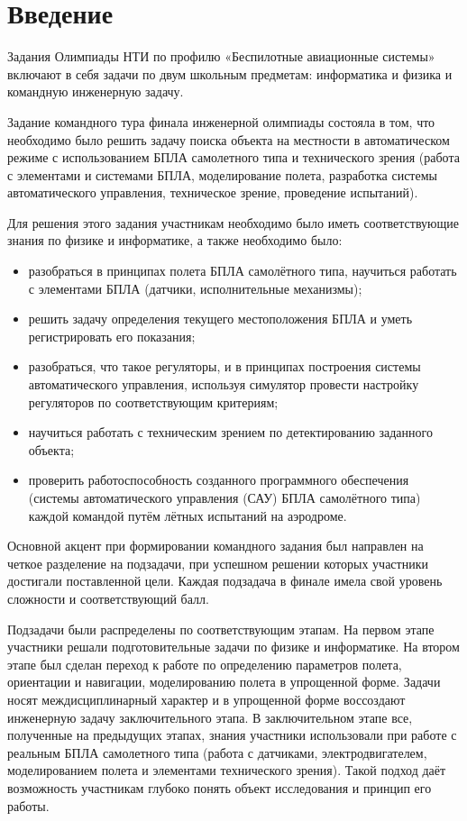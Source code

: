 %
\begingroup
\pagestyle{empty}

\section*{Введение}

Задания Олимпиады НТИ по профилю «Беспилотные авиационные системы» включают в себя задачи по двум школьным предметам: информатика и физика и командную инженерную задачу.

Задание командного тура финала инженерной олимпиады состояла в том, что необходимо было решить задачу поиска объекта на местности в автоматическом режиме с использованием БПЛА самолетного типа и технического зрения (работа с элементами и системами БПЛА, моделирование полета, разработка системы автоматического управления, техническое зрение, проведение испытаний).

Для решения этого задания участникам необходимо было иметь соответствующие знания по физике и информатике, а также необходимо было:
\begin{itemize}
    \item разобраться в принципах полета БПЛА самолётного типа, научиться работать с элементами БПЛА (датчики, исполнительные механизмы);
    \item решить задачу определения текущего местоположения БПЛА и уметь регистрировать его показания;
    \item разобраться, что такое регуляторы, и в принципах построения системы автоматического управления, используя симулятор провести настройку регуляторов по соответствующим критериям;
    \item научиться работать с техническим зрением по детектированию заданного объекта;
    \item проверить работоспособность созданного программного обеспечения (системы автоматического управления (САУ) БПЛА самолётного типа) каждой командой путём лётных испытаний на аэродроме.
\end{itemize}

Основной акцент при формировании командного задания был направлен на четкое разделение на подзадачи, при успешном решении которых участники достигали поставленной цели. Каждая подзадача в финале имела свой уровень сложности и соответствующий балл.

Подзадачи были распределены по соответствующим этапам. На первом этапе участники решали подготовительные задачи по физике и информатике. На втором этапе был сделан переход к работе по определению параметров полета, ориентации и навигации, моделированию полета в упрощенной форме. Задачи носят междисциплинарный характер и в упрощенной форме воссоздают инженерную задачу заключительного этапа. В заключительном этапе все, полученные на предыдущих этапах, знания участники использовали при работе с реальным БПЛА самолетного типа (работа с датчиками, электродвигателем, моделированием полета и элементами технического зрения). Такой подход даёт возможность участникам глубоко понять объект исследования и принцип его работы.

\clearpage
\endgroup